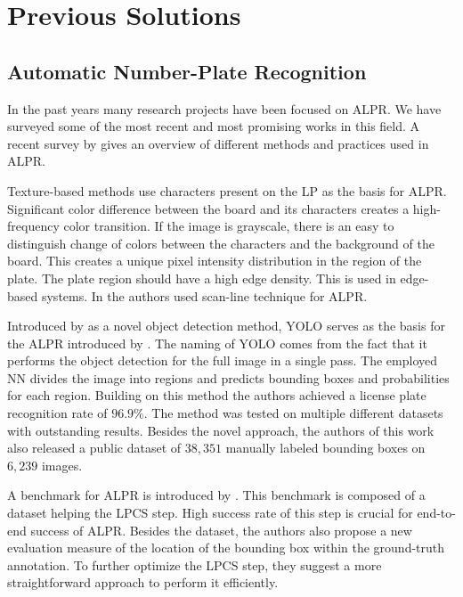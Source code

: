 \section{Previous Solutions}
\label{previous-solutions}

\subsection{Automatic Number-Plate Recognition}
\label{previous-solutions-anpr}
In the past years many research projects have been focused on \ac{ALPR}.
We have surveyed some of the most recent and most promising works in this field.
A recent survey by \cite{survOnMet} gives an overview of different methods and
practices used in \ac{ALPR}.

Texture-based methods use characters present on the \ac{LP} as the basis for
\ac{ALPR}. Significant color difference between the board and its characters
creates a high-frequency color transition. If the image is grayscale,
there is an easy to distinguish change of colors between the characters and the
background of the board. This creates a unique pixel intensity distribution in
the region of the plate. The plate region should have a high edge density. This
is used in edge-based systems. In \cite{HongFuJiaHuan} the authors used
scan-line technique for \ac{ALPR}.

Introduced by \cite{redmon2016look} as a novel object detection method,
\ac{YOLO} serves as the basis for the \ac{ALPR} introduced by
\cite{DBLP:journals/corr/abs-1909-01754}.
The naming of \ac{YOLO} comes from the fact that it performs the object detection
for the full image in a single pass. The employed \ac{NN} divides the image
into regions and predicts bounding boxes and probabilities for each region.
Building on this method the authors achieved a license plate recognition rate of
$96.9\%$.  The method was tested on multiple different datasets with outstanding
results.  Besides the novel approach, the authors of this work also released
a public dataset of $38,351$ manually labeled bounding boxes on $6,239$ images.

A benchmark for \ac{ALPR} is introduced by
\cite{DBLP:journals/corr/GoncalvesSMS16}. This benchmark is
composed of a dataset helping the \ac{LPCS} step. High success rate of this step
is crucial for end-to-end success of \ac{ALPR}. Besides the dataset, the authors
also propose a new evaluation measure of the location of the bounding
box within the ground-truth annotation. To further optimize the \ac{LPCS} step,
they suggest a more straightforward approach to perform it efficiently.

